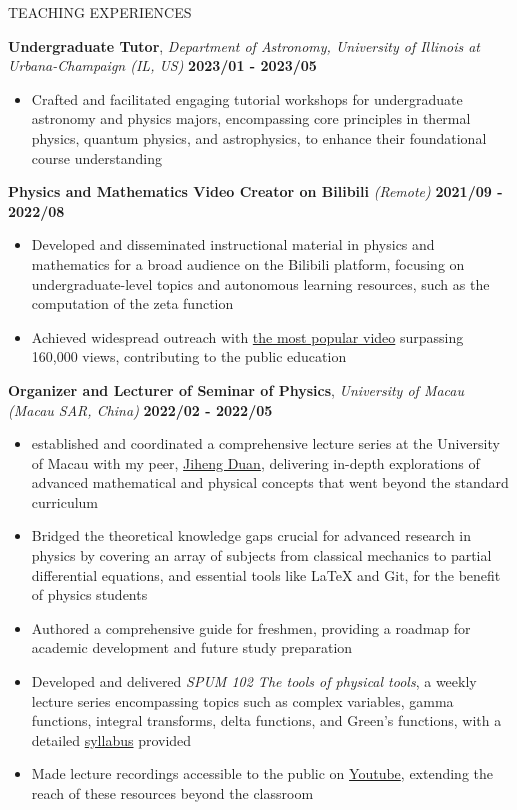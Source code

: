 \documentclass[10pt]{article} %
\begin{document}
\begin{section}{TEACHING EXPERIENCES}

\textbf{Undergraduate Tutor}, \textit{Department of Astronomy, University of Illinois at Urbana-Champaign (IL, US)} \hfill \textbf{2023/01 - 2023/05}
\begin{itemize}[leftmargin=1.5em]
    \item Crafted and facilitated engaging tutorial workshops for undergraduate astronomy and physics majors, encompassing core principles in thermal physics, quantum physics, and astrophysics, to enhance their foundational course understanding
\end{itemize}

\textbf{Physics and Mathematics Video Creator on Bilibili} \textit{(Remote)} \hfill \textbf{2021/09 - 2022/08}
\begin{itemize}[leftmargin=1.5em]
    \item Developed and disseminated instructional material in physics and mathematics for a broad audience on the Bilibili platform, focusing on undergraduate-level topics and autonomous learning resources, such as the computation of the zeta function
    \item Achieved widespread outreach with \href{https://www.bilibili.com/video/BV1th411W7xu/}{the most popular video} surpassing 160,000 views, contributing to the public education
\end{itemize}

\textbf{Organizer and Lecturer of Seminar of Physics}, \textit{University of Macau (Macau SAR, China)} \hfill \textbf{2022/02 - 2022/05}
\begin{itemize}[leftmargin=1.5em]
    \item established and coordinated a comprehensive lecture series at the University of Macau with my peer, \href{http://runawayfancy.me/}{Jiheng Duan}, delivering in-depth explorations of advanced mathematical and physical concepts that went beyond the standard curriculum
    \item Bridged the theoretical knowledge gaps crucial for advanced research in physics by covering an array of subjects from classical mechanics to partial differential equations, and essential tools like LaTeX and Git, for the benefit of physics students
    \item Authored a comprehensive guide for freshmen, providing a roadmap for academic development and future study preparation
    \item Developed and delivered \textit{SPUM 102 The tools of physical tools}, a weekly lecture series encompassing topics such as complex variables, gamma functions, integral transforms, delta functions, and Green's functions, with a detailed \href{https://github.com/Chisen-Lupus/Seminar-of-Physics-UM/blob/main/SPUM%20102%20The%20tools%20of%20physical%20tool.pdf}{syllabus} provided
    \item Made lecture recordings accessible to the public on \href{https://www.youtube.com/watch?v=nQkv03r-XeQ&list=PLV9fHDZW7hHWQ9rrAk7c9kdeV-Lqyt7pV&index=10}{Youtube}, extending the reach of these resources beyond the classroom
\end{itemize}


\end{section}
\end{document}
